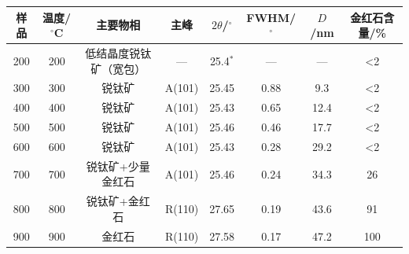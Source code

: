\begin{tabular}{@{}cccccccc@{}}
\toprule
样品 & 温度/$^\circ$C & 主要物相 & 主峰 & $2\theta$/$^\circ$ & FWHM/$^\circ$ & $D$/nm & 金红石含量/\% \\
\midrule
200 & 200 & 低结晶度锐钛矿（宽包） & --- & 25.4$^{*}$ & --- & --- & <2 \\
300 & 300 & 锐钛矿 & A(101) & 25.45 & 0.88 & 9.3 & <2 \\
400 & 400 & 锐钛矿 & A(101) & 25.43 & 0.65 & 12.4 & <2 \\
500 & 500 & 锐钛矿 & A(101) & 25.46 & 0.46 & 17.7 & <2 \\
600 & 600 & 锐钛矿 & A(101) & 25.43 & 0.28 & 29.2 & <2 \\
700 & 700 & 锐钛矿+少量金红石 & A(101) & 25.46 & 0.24 & 34.3 & 26 \\
800 & 800 & 锐钛矿+金红石 & R(110) & 27.65 & 0.19 & 43.6 & 91 \\
900 & 900 & 金红石 & R(110) & 27.58 & 0.17 & 47.2 & 100 \\
\bottomrule
\end{tabular}
